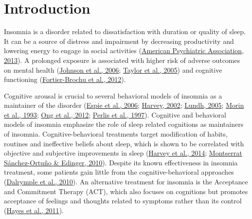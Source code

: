 \documentclass[
  ,doc,11pt, twoside,floatsintext]{apa6}
\begin{document}
\hypertarget{introduction}{%
\section{Introduction}\label{introduction}}

Insomnia is a disorder related to dissatisfaction with duration or quality of sleep. It can be a source of distress and impairment by decreasing productivity and lowering energy to engage in social activities (\protect\hyperlink{ref-americanpsychiatricassociation2013}{American Psychiatric Association, 2013}). A prolonged exposure is associated with higher risk of adverse outcomes on mental health (\protect\hyperlink{ref-johnson2006}{Johnson et al., 2006}; \protect\hyperlink{ref-taylor2005}{Taylor et al., 2005}) and cognitive functioning (\protect\hyperlink{ref-fortier-brochu2012}{Fortier-Brochu et al., 2012}).

Cognitive arousal is crucial to several behavioral models of insomnia as a maintainer of the disorder (\protect\hyperlink{ref-espie2006}{Espie et al., 2006}; \protect\hyperlink{ref-harvey2002}{Harvey, 2002}; \protect\hyperlink{ref-lundh2005}{Lundh, 2005}; \protect\hyperlink{ref-morin1993}{Morin et al., 1993}; \protect\hyperlink{ref-ong2012}{Ong et al., 2012}; \protect\hyperlink{ref-perlis1997}{Perlis et al., 1997}). Cognitive and behavioral models of insomnia emphasize the role of sleep related cognitions as maintainers of insomnia. Cognitive-behavioral treatments target modification of habits, routines and ineffective beliefs about sleep, which is shown to be correlated with objective and subjective improvements in sleep (\protect\hyperlink{ref-harvey2014}{Harvey et al., 2014}; \protect\hyperlink{ref-montserratsanchez-ortuno2010}{Montserrat Sánchez-Ortuño \& Edinger, 2010}). Despite its known effectiveness in insomnia treatment, some patients gain little from the cognitive-behavioral approaches (\protect\hyperlink{ref-dalrymple2010}{Dalrymple et al., 2010}). An alternative treatment for insomnia is the Acceptance and Commitment Therapy (ACT), which also focuses on cognitions but promotes acceptance of feelings and thoughts related to symptoms rather than its control (\protect\hyperlink{ref-hayes2011acceptance}{Hayes et al., 2011}).
\end{document}

